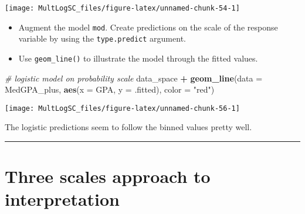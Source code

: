 \documentclass[
]{book}
\newenvironment{Shaded}{\begin{snugshade}}{\end{snugshade}}
\newcommand{\CommentTok}[1]{\textcolor[rgb]{0.56,0.35,0.01}{\textit{#1}}}
\newcommand{\DataTypeTok}[1]{\textcolor[rgb]{0.13,0.29,0.53}{#1}}
\newcommand{\KeywordTok}[1]{\textcolor[rgb]{0.13,0.29,0.53}{\textbf{#1}}}
\newcommand{\NormalTok}[1]{#1}
\newcommand{\OperatorTok}[1]{\textcolor[rgb]{0.81,0.36,0.00}{\textbf{#1}}}
\newcommand{\StringTok}[1]{\textcolor[rgb]{0.31,0.60,0.02}{#1}}
\providecommand{\tightlist}{%
  \setlength{\itemsep}{0pt}\setlength{\parskip}{0pt}}
\begin{document}
\begin{center}\texttt{[image: MultLogSC\_files/figure-latex/unnamed-chunk-54-1]} \end{center}

\begin{itemize}
\tightlist
\item
  Augment the model \texttt{mod}. Create predictions on the scale of the response variable by using the \texttt{type.predict} argument.
\end{itemize}

\begin{Shaded}
\end{Shaded}

\begin{itemize}
\tightlist
\item
  Use \texttt{geom\_line()} to illustrate the model through the fitted values.
\end{itemize}

\begin{Shaded}
\begin{Highlighting}[]
\CommentTok{# logistic model on probability scale}
\NormalTok{data_space }\OperatorTok{+}
\StringTok{  }\KeywordTok{geom_line}\NormalTok{(}\DataTypeTok{data =}\NormalTok{ MedGPA_plus, }\KeywordTok{aes}\NormalTok{(}\DataTypeTok{x =}\NormalTok{ GPA, }\DataTypeTok{y =}\NormalTok{ .fitted), }\DataTypeTok{color =} \StringTok{"red"}\NormalTok{)}
\end{Highlighting}
\end{Shaded}

\begin{center}\texttt{[image: MultLogSC\_files/figure-latex/unnamed-chunk-56-1]} \end{center}

The logistic predictions seem to follow the binned values pretty well.

\begin{center}\rule{0.5\linewidth}{0.5pt}\end{center}

\hypertarget{three-scales-approach-to-interpretation}{%
\section{Three scales approach to interpretation}\label{three-scales-approach-to-interpretation}}
\end{document}
